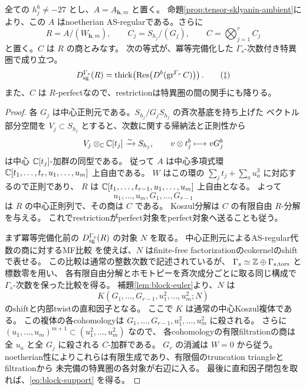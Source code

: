 \begin{proposition}[生成性の中心商への帰着]\label{prop:block-support}
 全ての \(h_j^6\ne-27\) とし、\(A=A_{\mathbf h,m}\) と置く。
 命題\ref{prop:tensor-sklyanin-ambient}により、この \(A\) はnoetherian AS-regularである。さらに
 \[
 R=A/(W_{\mathbf h,m}),\qquad
 C_j=S_{h_j}/(G_j),\qquad C=\bigotimes_{j=1}^r C_j
 \]
 と置く。\(C\) は \(R\) の商とみなす。
 次の等式が、冪等完備化した \(\Gamma_s\)-次数付き特異圏で成り立つ。
 \[
 D_{\mathrm{sg}}^{\Gamma_s}(R)
 =\operatorname{thick}\!\left(
 \operatorname{Res}\bigl(D^b(\operatorname{gr}^{\Gamma_s}C)\bigr)
 \right).
 \tag{\(\ddagger\)}\label{eq:block-support}
 \]
 また、\(C\) は \(R\)-perfectなので、restrictionは特異圏の間の関手にも降りる。
\end{proposition}
\begin{proof}
 各 \(G_j\) は中心正則元である。\(S_{h_j}/G_jS_{h_j}\) の斉次基底を持ち上げた
 ベクトル部分空間を \(V_j\subset S_{h_j}\) とすると、次数に関する帰納法と正則性から
 \[
 V_j\otimes_\mathbb C\mathbb C[t_j]\xrightarrow{\sim}S_{h_j},\qquad
 v\otimes t_j^b\longmapsto vG_j^b
 \]
 は中心 \(\mathbb C[t_j]\)-加群の同型である。
 従って \(A\) は中心多項式環
 \(\mathbb C[t_1,\ldots,t_r,u_1,\ldots,u_m]\) 上自由である。
 \(W\) はこの環の \(\sum_jt_j+\sum_au_a^3\) に対応するので正則であり、
 \(R\) は \(\mathbb C[t_1,\ldots,t_{r-1},u_1,\ldots,u_m]\) 上自由となる。
 よって
 \[
 u_1,\ldots,u_m,G_1,\ldots,G_{r-1}
 \]
 は \(R\) の中心正則列で、その商は \(C\) である。
 Koszul分解は \(C\) の有限自由 \(R\)-分解を与える。
 これでrestrictionがperfect対象をperfect対象へ送ることも従う。

 まず冪等完備化前の \(D_{\mathrm{sg}}^{\Gamma_s}(R)\) の対象 \(N\) を取る。
 中心正則元によるAS-regular代数の商に対するMF比較
 \cite[Theorem 5.8]{CCKM}を使えば、\(N\) はfinite-free factorizationのcokernelのshiftで表せる。
 この比較は通常の整数次数で記述されているが、
 \(\Gamma_s\simeq\mathbb Z\oplus\Gamma_{s,\mathrm{tors}}\) と標数零を用い、
 各有限自由分解とホモトピーを斉次成分ごとに取る同じ構成で
 \(\Gamma_s\)-次数を保った比較を得る。
 補題\ref{lem:block-euler}より、\(N\) は
 \[
 K(G_1,\ldots,G_{r-1},u_1^2,\ldots,u_m^2;N)
 \]
 のshiftと内部twistの直和因子となる。
 ここで \(K\) は通常の中心Koszul複体である。
 この複体の各cohomologyは \(G_1,\ldots,G_{r-1},u_1^2,\ldots,u_m^2\) に殺される。
 さらに \((u_1,\ldots,u_m)^{m+1}\subset(u_1^2,\ldots,u_m^2)\) なので、
 各cohomologyの有限filtrationの商は全 \(u_a\) と全 \(G_j\) に殺される \(C\)-加群である。
 \(G_r\) の消滅は \(W=0\) から従う。
 noetherian性によりこれらは有限生成であり、有限個のtruncation triangleとfiltrationから
 未完備の特異圏の各対象が右辺に入る。
 最後に直和因子閉包を取れば、\eqref{eq:block-support} を得る。
\end{proof}

